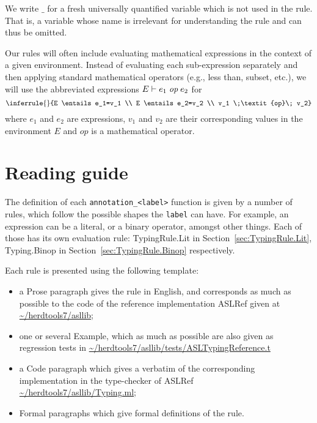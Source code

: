 \documentclass{book}
\newcommand\Ignore[0]{\texttt{\_}}
\begin{document}
We write $\Ignore$ for a fresh universally quantified variable which is not used in the rule. That is, a variable whose name is irrelevant for understanding the rule and can thus be omitted.

Our rules will often include evaluating mathematical expressions in the context of a given environment. Instead of evaluating each sub-expression separately and then applying standard mathematical operators (e.g., less than, subset, etc.), we will use the abbreviated expressions $E \vdash e_1 \;\textit{op}\; e_2$ for
\[
\inferrule{}{E \entails e_1=v_1 \\ E \entails e_2=v_2 \\ v_1 \;\textit{op}\; v_2}
\]
where $e_1$ and $e_2$ are expressions, $v_1$ and $v_2$ are their corresponding values in the environment $E$ and $\textit{op}$ is a mathematical operator.

\chapter{Reading guide}

The definition of each \texttt{annotation\_<label>} function is given by a number of
rules, which follow the possible shapes the \texttt{label} can have. For
example, an expression can be a literal, or a binary operator, amongst other
things. Each of those has its own evaluation rule: TypingRule.Lit in
Section~\ref{sec:TypingRule.Lit}, Typing.Binop in
Section~\ref{sec:TypingRule.Binop} respectively.

Each rule is presented using the following template:
\begin{itemize}
\item a Prose paragraph gives the rule in English, and corresponds as much as possible to the code of the reference implementation ASLRef given at \url{~/herdtools7/asllib};
\item one or several Example, which as much as possible are also given as regression tests in \url{~/herdtools7/asllib/tests/ASLTypingReference.t}
\item a Code paragraph which gives a verbatim of the corresponding implementation in the type-checker of ASLRef \url{~/herdtools7/asllib/Typing.ml};
\item Formal paragraphs which give formal definitions of the rule.
\end{itemize}
\end{document}
